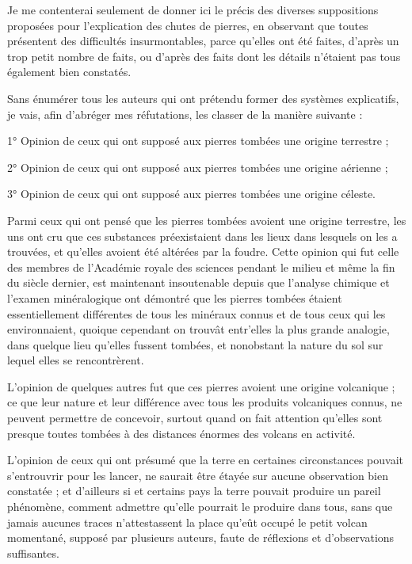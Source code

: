 \documentclass[a4paper, 12pt, oneside, french]{article}
\begin{document}
Je me contenterai seulement de donner ici le précis des diverses suppositions proposées pour l'explication des chutes de pierres, en observant que toutes présentent des difficultés insurmontables, parce qu'elles ont été faites, d'après un trop petit nombre de faits, ou d'après des faits dont les détails n'étaient pas tous également bien constatés.

Sans énumérer tous les auteurs qui ont prétendu former des systèmes explicatifs, je vais, afin d'abréger mes réfutations, les classer de la manière suivante :

1° Opinion de ceux qui ont supposé aux pierres tombées une origine terrestre ;

2° Opinion de ceux qui ont supposé aux pierres tombées une origine aérienne ;

3° Opinion de ceux qui ont supposé aux pierres tombées une origine céleste.

Parmi ceux qui ont pensé que les pierres tombées avoient une origine terrestre, les uns ont cru que ces substances préexistaient dans les lieux dans lesquels on les a trouvées, et qu'elles avoient été altérées par la foudre. Cette opinion qui fut celle des membres de l'Académie royale des sciences pendant le milieu et même la fin du siècle dernier, est maintenant insoutenable depuis que l'analyse chimique et l'examen minéralogique ont démontré que les pierres tombées étaient essentiellement différentes de tous les minéraux connus et de tous ceux qui les environnaient, quoique cependant on trouvât entr'elles la plus grande analogie, dans quelque lieu qu'elles fussent tombées, et nonobstant la nature du sol sur lequel elles se rencontrèrent.

L'opinion de quelques autres fut que ces pierres avoient une origine volcanique ; ce que leur nature et leur différence avec tous les produits volcaniques connus, ne peuvent permettre de concevoir, surtout quand on fait attention qu'elles sont presque toutes tombées à des distances énormes des volcans en activité.

L'opinion de ceux qui ont présumé que la terre en certaines circonstances pouvait s'entrouvrir pour les lancer, ne saurait être étayée sur aucune observation bien constatée ; et d'ailleurs si et certains pays la terre pouvait produire un pareil phénomène, comment admettre qu'elle pourrait le produire dans tous, sans que jamais aucunes traces n'attestassent la place qu'eût occupé le petit volcan momentané, supposé par plusieurs auteurs, faute de réflexions et d'observations suffisantes.
\end{document}
